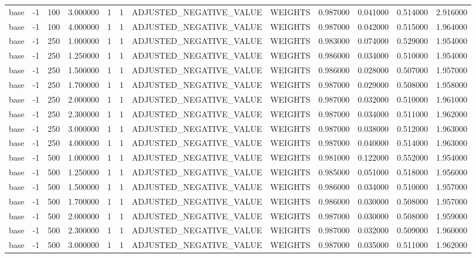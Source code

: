 \begin{tabular}{lrrrllllrrrr}
base & -1 & 100 & 3.000000 & 1 & 1 & ADJUSTED_NEGATIVE_VALUE & WEIGHTS & 0.987000 & 0.041000 & 0.514000 & 2.916000 \\
base & -1 & 100 & 4.000000 & 1 & 1 & ADJUSTED_NEGATIVE_VALUE & WEIGHTS & 0.987000 & 0.042000 & 0.515000 & 1.964000 \\
base & -1 & 250 & 1.000000 & 1 & 1 & ADJUSTED_NEGATIVE_VALUE & WEIGHTS & 0.983000 & 0.074000 & 0.529000 & 1.954000 \\
base & -1 & 250 & 1.250000 & 1 & 1 & ADJUSTED_NEGATIVE_VALUE & WEIGHTS & 0.986000 & 0.034000 & 0.510000 & 1.954000 \\
base & -1 & 250 & 1.500000 & 1 & 1 & ADJUSTED_NEGATIVE_VALUE & WEIGHTS & 0.986000 & 0.028000 & 0.507000 & 1.957000 \\
base & -1 & 250 & 1.700000 & 1 & 1 & ADJUSTED_NEGATIVE_VALUE & WEIGHTS & 0.987000 & 0.029000 & 0.508000 & 1.958000 \\
base & -1 & 250 & 2.000000 & 1 & 1 & ADJUSTED_NEGATIVE_VALUE & WEIGHTS & 0.987000 & 0.032000 & 0.510000 & 1.961000 \\
base & -1 & 250 & 2.300000 & 1 & 1 & ADJUSTED_NEGATIVE_VALUE & WEIGHTS & 0.987000 & 0.034000 & 0.511000 & 1.962000 \\
base & -1 & 250 & 3.000000 & 1 & 1 & ADJUSTED_NEGATIVE_VALUE & WEIGHTS & 0.987000 & 0.038000 & 0.512000 & 1.963000 \\
base & -1 & 250 & 4.000000 & 1 & 1 & ADJUSTED_NEGATIVE_VALUE & WEIGHTS & 0.987000 & 0.040000 & 0.514000 & 1.963000 \\
base & -1 & 500 & 1.000000 & 1 & 1 & ADJUSTED_NEGATIVE_VALUE & WEIGHTS & 0.981000 & 0.122000 & 0.552000 & 1.954000 \\
base & -1 & 500 & 1.250000 & 1 & 1 & ADJUSTED_NEGATIVE_VALUE & WEIGHTS & 0.985000 & 0.051000 & 0.518000 & 1.956000 \\
base & -1 & 500 & 1.500000 & 1 & 1 & ADJUSTED_NEGATIVE_VALUE & WEIGHTS & 0.986000 & 0.034000 & 0.510000 & 1.957000 \\
base & -1 & 500 & 1.700000 & 1 & 1 & ADJUSTED_NEGATIVE_VALUE & WEIGHTS & 0.986000 & 0.030000 & 0.508000 & 1.957000 \\
base & -1 & 500 & 2.000000 & 1 & 1 & ADJUSTED_NEGATIVE_VALUE & WEIGHTS & 0.987000 & 0.030000 & 0.508000 & 1.959000 \\
base & -1 & 500 & 2.300000 & 1 & 1 & ADJUSTED_NEGATIVE_VALUE & WEIGHTS & 0.987000 & 0.032000 & 0.509000 & 1.960000 \\
base & -1 & 500 & 3.000000 & 1 & 1 & ADJUSTED_NEGATIVE_VALUE & WEIGHTS & 0.987000 & 0.035000 & 0.511000 & 1.962000 \\

\end{tabular}
